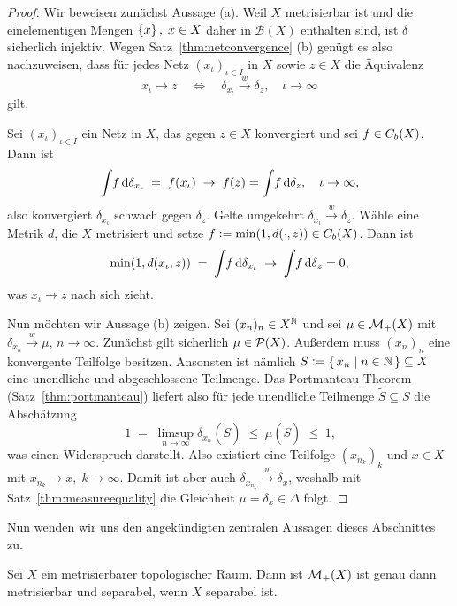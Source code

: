 \documentclass[../main/main.tex]{subfiles}
\begin{document}
	\begin{proof}
		Wir beweisen zunächst Aussage (a). Weil $X$ metrisierbar ist und die einelementigen Mengen $\left\{x\right\}, \; x \in X$ daher in $\mathcal{B}(X)$ enthalten sind, ist $\delta$ sicherlich injektiv.
		Wegen Satz~\ref{thm:netconvergence} (b) genügt es also nachzuweisen, dass für jedes Netz $(x_\iota)_{\iota \in I}$ in $X$ sowie $z \in X$ die Äquivalenz
		\[ x_\iota \to z \quad \iff \quad \delta_{x_\iota} \xrightarrow{w} \delta_z, \quad \iota \to \infty \]
		gilt. 
		
		Sei  $(x_\iota)_{\iota \in I}$ ein Netz in $X$, das gegen $z \in X$ konvergiert und sei $f \in C_b(X)$. Dann ist
		\[ \int_{} \, f \, \mathrm{d}\delta_{x_\iota} \; = \; f(x_\iota) \; \to \; f(z) = \int_{} \, f \, \mathrm{d}\delta_{z}, \quad \iota \to \infty \text{,} \]
		also konvergiert $\delta_{x_\iota}$ schwach gegen $\delta_z$. Gelte umgekehrt $\delta_{x_\iota} \xrightarrow{w} \delta_z$. Wähle eine Metrik $d$, die $X$ metrisiert und
		setze $f \vcentcolon = \min (1, d(\cdot, z)) \in C_b(X)$. Dann ist 
		\[ \min (1, d(x_\iota, z)) \; = \; \int_{} \, f \, \mathrm{d}\delta_{x_\iota} \; \to \; \int_{} \, f \, \mathrm{d}\delta_{z} = 0 \text{,} \]
		was $x_\iota \to z$ nach sich zieht.
		
		Nun möchten wir Aussage (b) zeigen. Sei $(x_n)_n \in X^{\mathbb{N}}$ und sei $\mu \in \mathcal{M}_{+}(X)$ mit $\delta_{x_n} \xrightarrow{w} \mu$, $n \to \infty$. Zunächst gilt sicherlich $\mu \in \mathcal{P}(X)$.
		Außerdem muss $(x_n)_n$ eine konvergente Teilfolge besitzen. Ansonsten ist nämlich $S \vcentcolon = \left\{\, x_n \; \middle| \; n \in \mathbb{N} \,\right\} \subseteq X$ eine unendliche und abgeschlossene Teilmenge. Das Portmanteau-Theorem (Satz~\ref{thm:portmanteau}) liefert also für jede unendliche Teilmenge $\tilde{S} \subseteq S$ die Abschätzung
		\[ 1 \; = \; \limsup_{n \to \infty} \delta_{x_n}(\tilde{S}) \; \leq \; \mu(\tilde{S}) \; \leq \; 1 \text{,} \]
		was einen Widerspruch darstellt. Also existiert eine Teilfolge $(x_{n_k})_k$ und $x \in X$ mit $x_{n_k} \to x, \; k \to \infty$. Damit ist aber auch $\delta_{x_{n_k}} \xrightarrow{w} \delta_x$, weshalb mit
		Satz~\ref{thm:measureequality} die Gleichheit $\mu = \delta_x \in \Delta$ folgt.
	\end{proof}

	Nun wenden wir uns den angekündigten zentralen Aussagen dieses Abschnittes zu. 
	
	\begin{Satz}
		\label{thm:finitemeasuresmetrizableseparable}
		Sei $X$ ein metrisierbarer topologischer Raum. Dann ist $\mathcal{M}_{+}(X)$ ist genau dann metrisierbar und separabel, wenn $X$ separabel ist.
	\end{Satz}
\end{document}
